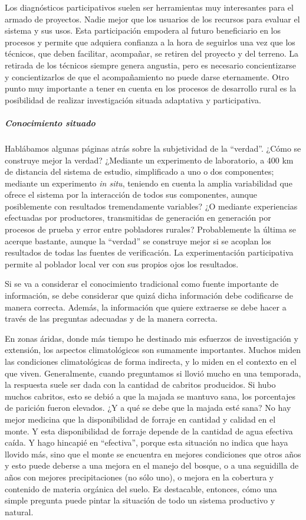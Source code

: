 \documentclass[
]{article}
\begin{document}
Los diagnósticos participativos suelen ser herramientas muy interesantes
para el armado de proyectos. Nadie mejor que los usuarios de los
recursos para evaluar el sistema y sus usos. Esta participación empodera
al futuro beneficiario en los procesos y permite que adquiera confianza
a la hora de seguirlos una vez que los técnicos, que deben facilitar,
acompañar, se retiren del proyecto y del terreno. La retirada de los
técnicos siempre genera angustia, pero es necesario concientizarse y
concientizarlos de que el acompañamiento no puede darse eternamente.
Otro punto muy importante a tener en cuenta en los procesos de
desarrollo rural es la posibilidad de realizar investigación situada
adaptativa y participativa.

\hypertarget{conocimiento-situado}{%
\subparagraph{Conocimiento situado}\label{conocimiento-situado}}

Hablábamos algunas páginas atrás sobre la subjetividad de la ``verdad''.
¿Cómo se construye mejor la verdad? ¿Mediante un experimento de
laboratorio, a 400 km de distancia del sistema de estudio, simplificado
a uno o dos componentes; mediante un experimento \emph{in situ},
teniendo en cuenta la amplia variabilidad que ofrece el sistema por la
interacción de todos sus componentes, aunque posiblemente con resultados
tremendamente variables? ¿O mediante experiencias efectuadas por
productores, transmitidas de generación en generación por procesos de
prueba y error entre pobladores rurales? Probablemente la última se
acerque bastante, aunque la ``verdad'' se construye mejor si se acoplan
los resultados de todas las fuentes de verificación. La experimentación
participativa permite al poblador local ver con sus propios ojos los
resultados.

Si se va a considerar el conocimiento tradicional como fuente importante
de información, se debe considerar que quizá dicha información debe
codificarse de manera correcta. Además, la información que quiere
extraerse se debe hacer a través de las preguntas adecuadas y de la
manera correcta.

En zonas áridas, donde más tiempo he destinado mis esfuerzos de
investigación y extensión, los aspectos climatológicos son sumamente
importantes. Muchos miden las condiciones climatológicas de forma
indirecta, y lo miden en el contexto en el que viven. Generalmente,
cuando preguntamos si llovió mucho en una temporada, la respuesta suele
ser dada con la cantidad de cabritos producidos. Si hubo muchos
cabritos, esto se debió a que la majada se mantuvo sana, los porcentajes
de parición fueron elevados. ¿Y a qué se debe que la majada esté sana?
No hay mejor medicina que la disponibilidad de forraje en cantidad y
calidad en el monte. Y esta disponibilidad de forraje depende de la
cantidad de agua efectiva caída. Y hago hincapié en ``efectiva'', porque
esta situación no indica que haya llovido más, sino que el monte se
encuentra en mejores condiciones que otros años y esto puede deberse a
una mejora en el manejo del bosque, o a una seguidilla de años con
mejores precipitaciones (no sólo uno), o mejora en la cobertura y
contenido de materia orgánica del suelo. Es destacable, entonces, cómo
una simple pregunta puede pintar la situación de todo un sistema
productivo y natural.
\end{document}
